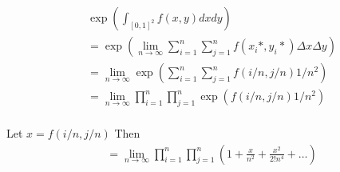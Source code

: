 \documentclass{article}
\begin{document}
\[
\begin{split}
    & \exp(\int_{[0, 1]^{2}} f(x, y) dx dy) \\
    &= \exp(\lim_{n \rightarrow \infty} \sum_{i=1}^{n} \sum_{j=1}^{n}
        f(x_{i}*, y_{i}*) \Delta x \Delta y) \\
    &= \lim_{n \rightarrow \infty}  \exp(\sum_{i=1}^{n} \sum_{j=1}^{n}
        f(i/n, j/n) 1/n^{2}) \\
    &= \lim_{n \rightarrow \infty}  \prod_{i=1}^{n} \prod_{j=1}^{n}
        \exp(f(i/n, j/n) 1/n^{2}) \\
\end{split}
\]

Let $x = f(i/n, j/n)$
Then 
\[
\begin{split}
&= \lim_{n \rightarrow \infty}  \prod_{i=1}^{n} \prod_{j=1}^{n}
    (1 + \frac{x}{n^{2}} + \frac{x^{2}}{2! n^{4}} + \ldots ) \\
\end{split}
\]
\end{document}
